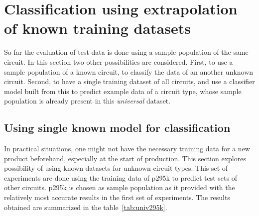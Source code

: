 \section{Classification using extrapolation of known training datasets}
So far the evaluation of test data is done using a sample population of the same circuit. In this section two other possibilities are considered. First, to use a sample population of a known circuit, to classify the data of an another unknown circuit. Second, to have a single training dataset of all circuits, and use a classifier model built from this to predict example data of a circuit type, whose sample population is already present in this \emph{universal} dataset.

\subsection{Using single known model for classification}
In practical situations, one might not have the necessary training data for a new product beforehand, especially at the start of production. This section explores possibility of using known datasets for unknown circuit types. This set of experiments are done using the training data of p295k to predict test sets of other circuits. p295k is chosen as sample population as it provided with the relatively most accurate results in the first set of experiments. The results obtained are summarized in the table~\ref{tab:univ295k}.

